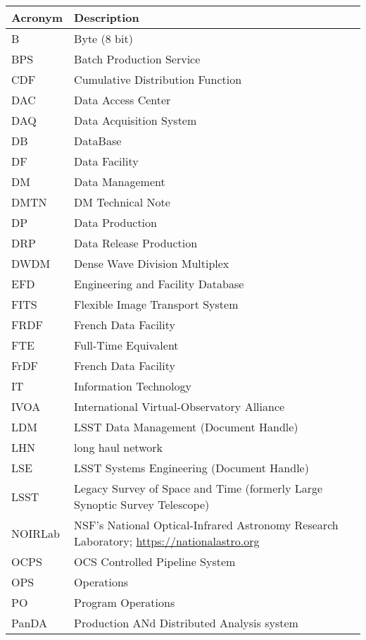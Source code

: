 \addtocounter{table}{-1}
\begin{longtable}{p{}p{}}\hline
\textbf{Acronym} & \textbf{Description}  \\\hline

B & Byte (8 bit) \\\hline
BPS & Batch Production Service \\\hline
CDF & Cumulative Distribution Function \\\hline
DAC & Data Access Center \\\hline
DAQ & Data Acquisition System \\\hline
DB & DataBase \\\hline
DF & Data Facility \\\hline
DM & Data Management \\\hline
DMTN & DM Technical Note \\\hline
DP & Data Production \\\hline
DRP & Data Release Production \\\hline
DWDM & Dense Wave Division Multiplex \\\hline
EFD & Engineering and Facility Database \\\hline
FITS & Flexible Image Transport System \\\hline
FRDF & French Data Facility \\\hline
FTE & Full-Time Equivalent \\\hline
FrDF & French Data Facility \\\hline
IT & Information Technology \\\hline
IVOA & International Virtual-Observatory Alliance \\\hline
LDM & LSST Data Management (Document Handle) \\\hline
LHN & long haul network \\\hline
LSE & LSST Systems Engineering (Document Handle) \\\hline
LSST & Legacy Survey of Space and Time (formerly Large Synoptic Survey Telescope) \\\hline
NOIRLab & NSF's National Optical-Infrared Astronomy Research Laboratory; \url{https://nationalastro.org} \\\hline
OCPS & OCS Controlled Pipeline System \\\hline
OPS & Operations \\\hline
PO & Program Operations \\\hline
PanDA &  Production ANd Distributed Analysis system \\\hline

\end{longtable}
